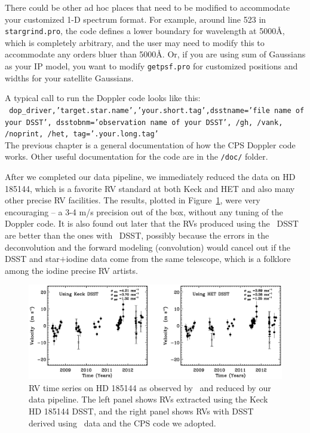 There could be other ad hoc places that need to be modified to
accommodate your customized 1-D spectrum format. For example, around
line 523 in {\tt stargrind.pro}, the code defines a lower boundary for
wavelength at 5000\AA, which is completely arbitrary, and the user may
need to modify this to accommodate any orders bluer than 5000\AA. Or,
if you are using sum of Gaussians as your IP model, you want to modify
{\tt getpsf.pro} for customized positions and widths for your
satellite Gaussians.

A typical call to run the Doppler code looks like this:\\
{\tt
  dop\_driver,'target.star.name','your.short.tag',dsstname='file name
  of your DSST', dsstobnm='observation name of your
  DSST', /gh, /vank, /noprint, /het, tag='.your.long.tag'
} \\ 
The previous chapter is a general documentation of how the CPS Doppler
code works. Other useful documentation for the code are in the {\tt /doc/}
folder.

After we completed our data pipeline, we immediately reduced the data
on HD 185144, which is a favorite RV standard at both Keck and HET and
also many other precise RV facilities. The results, plotted in
Figure~\ref{het:fig:sigdra}, were very encouraging -- a 3-4 m/s
precision out of the box, without any tuning of the Doppler
code. It is also found out later that the RVs produced using the \het\
DSST are better than the ones with \keck\ DSST, possibly because the
errors in the deconvolution and the forward modeling (convolution)
would cancel out if the DSST and star$+$iodine data come from the same
telescope, which is a folklore among the iodine precise RV artists.

\begin{figure}
\centering
\includegraphics[scale=0.3]{het/sigdra.eps}
\caption{RV time series on HD 185144 as observed by \het\ and reduced
  by our data pipeline. The left panel shows RVs extracted using the
  Keck HD 185144 DSST, and the right panel shows RVs with DSST derived
  using \het\ data and the CPS code we adopted.
\label{het:fig:sigdra}}
\end{figure}

